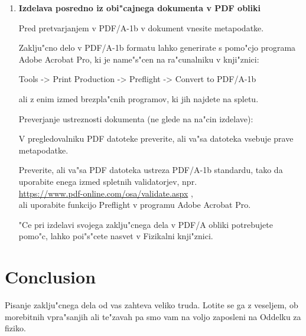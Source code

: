 \begin{enumerate}
\item{\bf  Izdelava posredno iz obi"cajnega dokumenta v PDF obliki}


Pred pretvarjanjem v PDF/A-1b v dokument vnesite metapodatke.

Zaklju"cno delo v PDF/A-1b formatu lahko generirate s pomo"cjo programa Adobe Acrobat Pro, ki je name"s"cen na ra"cunalniku v knji"znici:

Tools -> Print Production -> Preflight -> Convert to PDF/A-1b

ali z enim izmed brezpla"cnih programov, ki jih najdete na spletu.

Preverjanje ustreznosti dokumenta (ne glede na na"cin izdelave):

V pregledovalniku PDF datoteke preverite, ali va"sa datoteka vsebuje prave metapodatke.

Preverite, ali va"sa PDF datoteka ustreza PDF/A-1b standardu, tako da uporabite enega izmed spletnih validatorjev, npr.\\
\url{https://www.pdf-online.com/osa/validate.aspx} \cite{Val},\\
ali uporabite funkcijo Preflight v programu Adobe Acrobat Pro.

"Ce pri izdelavi svojega zaklju"cnega dela v PDF/A obliki potrebujete pomo"c, lahko poi"s"cete nasvet v Fizikalni knji"znici.

\end{enumerate}

%
\chapter{Conclusion}

Pisanje zaklju"cnega dela od vas zahteva veliko truda. Lotite se ga z veseljem, ob morebitnih vpra"sanjih ali te"zavah pa smo vam na voljo zaposleni na Oddelku za fiziko.



\cleardoublepage{}
\renewcommand\bibname{Bibliography}





